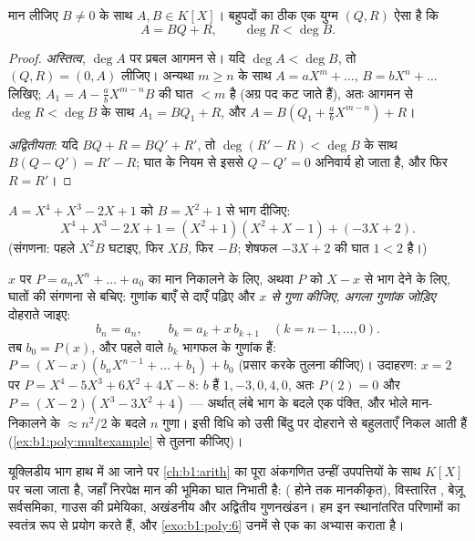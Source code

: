 \begin{theorem}[यूक्लिडीय भाग]\label{thm:b1:poly:division}
मान लीजिए $B \neq 0$ के साथ $A, B \in K[X]$। बहुपदों का ठीक एक युग्म $(Q,
R)$ ऐसा है कि
\[
A = BQ + R, \qquad \deg R < \deg B .
\]
\end{theorem}

\begin{proof}
\emph{अस्तित्व}, $\deg A$ पर प्रबल आगमन से। यदि $\deg A < \deg B$, तो $(Q,
R) = (0, A)$ लीजिए। अन्यथा $m \geq n$ के साथ $A = a X^m + \dots$, $B = b X^n
+ \dots$ लिखिए;  $A_1 = A - \frac ab X^{m-n} B$ की घात $< m$ है (अग्र
पद कट जाते हैं), अतः आगमन से $\deg R < \deg B$ के साथ $A_1 = BQ_1 + R$, और
$A = B(Q_1 + \frac ab X^{m-n}) + R$।

\emph{अद्वितीयता}: यदि $BQ + R = BQ' + R'$, तो $\deg(R' - R) < \deg B$ के
साथ $B(Q - Q') = R' - R$; घात के नियम से इससे $Q - Q' = 0$ अनिवार्य हो जाता
है, और फिर $R = R'$।
\end{proof}

\begin{example}\label{ex:b1:poly:division}
$A = X^4 + X^3 - 2X + 1$ को $B = X^2 + 1$ से भाग दीजिए:
\[
X^4 + X^3 - 2X + 1 = (X^2 + 1)(X^2 + X - 1) + (-3X + 2).
\]
(संगणना: पहले $X^2 B$ घटाइए, फिर $X B$, फिर $-B$; शेषफल $-3X + 2$ की घात $1
< 2$ है।)
\end{example}

\begin{method}[हॉर्नर विधि]\label{met:b1:poly:horner}
$x$ पर $P = a_nX^n + \dots + a_0$ का मान निकालने के लिए, अथवा $P$ को $X - x$
से भाग देने के लिए, घातों की संगणना से बचिए: गुणांक बाएँ से दाएँ पढ़िए और
\emph{$x$ से गुणा कीजिए, अगला गुणांक जोड़िए} दोहराते जाइए:
\[
b_n = a_n, \qquad b_{k} = a_{k} + x\,b_{k+1}
\quad (k = n-1, \dots, 0) .
\]
तब $b_0 = P(x)$, और पहले वाले $b_k$ भागफल के गुणांक हैं: $P = (X -
x)(b_nX^{n-1} + \dots + b_1) + b_0$ (प्रसार करके तुलना कीजिए)। उदाहरण: $x =
2$ पर $P = X^4 - 5X^3 + 6X^2 + 4X - 8$: $b$ हैं $1, -3, 0, 4, 0$, अतः $P(2)
= 0$ और $P = (X-2)(X^3 - 3X^2 + 4)$ --- अर्थात् लंबे भाग के बदले एक पंक्ति,
और भोले मान-निकालने के $\approx n^2/2$ के बदले $n$ गुणा। इसी विधि को उसी
बिंदु पर दोहराने से बहुलताएँ निकल आती हैं (\cref{ex:b1:poly:multexample} से
तुलना कीजिए)।
\end{method}

\begin{remark}[{$K[X]$ का अंकगणित}]
यूक्लिडीय भाग हाथ में आ जाने पर \cref{ch:b1:arith} का पूरा अंकगणित उन्हीं
उपपत्तियों के साथ $K[X]$ पर चला जाता है, जहाँ निरपेक्ष मान की भूमिका घात
निभाती है:  ( होने तक मानकीकृत), विस्तारित
, बेज़ू सर्वसमिका, गाउस की प्रमेयिका, अखंडनीय  और
अद्वितीय गुणनखंडन। हम इन स्थानांतरित परिणामों का स्वतंत्र रूप से प्रयोग करते
हैं, और \cref{exo:b1:poly:6} उनमें से एक का अभ्यास कराता है।
\end{remark}

